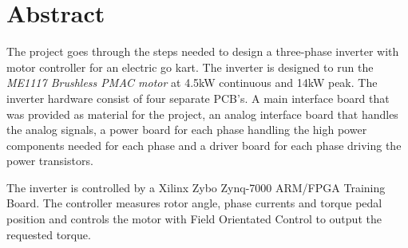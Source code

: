 \section{Abstract}
The project goes through the steps needed to design a three-phase inverter with motor controller for an electric go kart. 
The inverter is designed to run the \textit{ME1117 Brushless PMAC motor} at 4.5kW continuous and 14kW peak. The inverter hardware consist of four separate PCB's. A main interface board that was provided as material for the project, an analog interface board that handles the analog signals, a power board for each phase handling the high power components needed for each phase and a driver board for each phase driving the power transistors. 

The inverter is controlled by a Xilinx Zybo Zynq-7000 ARM/FPGA Training Board. The controller measures rotor angle, phase currents and torque pedal position and controls the motor with Field Orientated Control to output the requested torque. 

